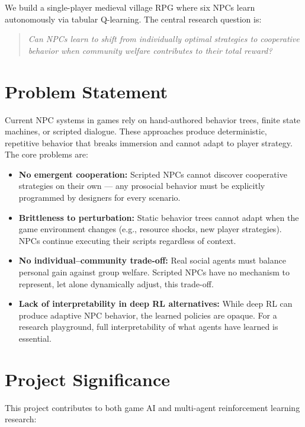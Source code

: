 \documentclass[12pt, a4paper, oneside]{report}
\begin{document}
We build a single-player medieval village RPG where six NPCs learn autonomously via tabular Q-learning. The central research question is:

\begin{quote}
\textit{Can NPCs learn to shift from individually optimal strategies to cooperative behavior when community welfare contributes to their total reward?}
\end{quote}

\section{Problem Statement}
\label{sec:problem-statement}

Current NPC systems in games rely on hand-authored behavior trees, finite state machines, or scripted dialogue. These approaches produce deterministic, repetitive behavior that breaks immersion and cannot adapt to player strategy. The core problems are:

\begin{itemize}
    \item \textbf{No emergent cooperation:} Scripted NPCs cannot discover cooperative strategies on their own --- any prosocial behavior must be explicitly programmed by designers for every scenario.
    \item \textbf{Brittleness to perturbation:} Static behavior trees cannot adapt when the game environment changes (e.g., resource shocks, new player strategies). NPCs continue executing their scripts regardless of context.
    \item \textbf{No individual--community trade-off:} Real social agents must balance personal gain against group welfare. Scripted NPCs have no mechanism to represent, let alone dynamically adjust, this trade-off.
    \item \textbf{Lack of interpretability in deep RL alternatives:} While deep RL can produce adaptive NPC behavior, the learned policies are opaque. For a research playground, full interpretability of what agents have learned is essential.
\end{itemize}

\section{Project Significance}
\label{sec:project-significance}

This project contributes to both game AI and multi-agent reinforcement learning research:
\end{document}

